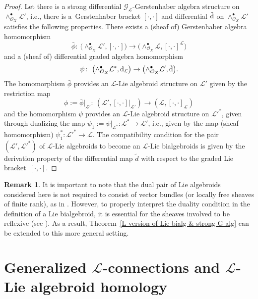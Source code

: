 \documentclass[pdftex]{sigma}
\numberwithin{equation}{section}
\theoremstyle{definition}
\newtheorem{Rem}[Thm]{Remark}
\begin{document}
\begin{proof}
	Let there is a strong differential $\mathcal{G}_{\mathcal{L}}$-Gerstenhaber algebra structure on
	$\wedge^\bullet_{\mathcal{O}_X} \mathcal{L}'$, i.e., there is a~Gerstenhaber bracket $[\cdot, \cdot]$ and differential $\tilde{{\rm d}}$ on $\wedge^\bullet_{\mathcal{O}_X} \mathcal{L}'$ satisfies the following properties. There exists a (sheaf of) Gerstenhaber algebra homomorphism
\[
\bar{\phi}\colon \ \bigl(\wedge^\bullet_{\mathcal{O}_X} \mathcal{L}', [\cdot, \cdot]\bigr) \rightarrow \bigl(\wedge_{\mathcal{O}_X}^\bullet \mathcal{L}, [\cdot,\cdot]^{\mathcal{L}}\bigr)
\]
	and a (sheaf of) differential graded algebra homomorphism
\[
\psi\colon \ \bigl(\wedge_{\mathcal{O}_X}^\bullet \mathcal{L}^*, {\rm d}_{\mathcal{L}}\bigr) \rightarrow \bigl(\wedge^\bullet_{\mathcal{O}_X} \mathcal{L}',\tilde{{\rm d}}\bigr).
\]
	The homomorphism $\bar{\phi}$ provides an $\mathcal{L}$-Lie algebroid structure on $\mathcal{L}'$ given by the restriction map
\[
\phi:=\bar{\phi}|_{\mathcal{L}'}\colon \ (\mathcal{L}', [\cdot, \cdot]|_{\mathcal{L}'}) \rightarrow (\mathcal{L}, [\cdot, \cdot]_{\mathcal{L}})
\]
	and the homomorphism $\psi$ provides an $\mathcal{L}$-Lie algebroid structure on $\mathcal{L}'^*$, given through dualizing the map
	$\psi_1:= \psi|_{\mathcal{L}^*}\colon \mathcal{L}^* \rightarrow \mathcal{L}'$, i.e., given by the map (sheaf homomorphism)
$\psi_1^*\colon \mathcal{L}'^* \rightarrow \mathcal{L}$.
The compatibility condition for the pair $(\mathcal{L}', \mathcal{L}'^*)$ of $\mathcal{L}$-Lie algebroids to become an $\mathcal{L}$-Lie bialgebroids is given by the derivation property of the differential map $\tilde{d}$ with respect to the graded Lie bracket~$[\cdot, \cdot]$.
\end{proof}
\begin{Rem} \label{BV-reflexive}
	It is important to note that the dual pair of Lie algebroids considered here is not required to consist of vector bundles (or locally free sheaves of finite rank), as in \cite{KM, KM-PX, PX}. However, to properly interpret the duality condition in the definition of a Lie bialgebroid, it is essential for the sheaves involved to be reflexive (see \cite{BP}). As a result, Theorem~\ref{L-version of Lie bialg & strong G alg} can be extended to this more general setting.
\end{Rem}

 \section[Generalized L-connections and L-Lie algebroid homology]{Generalized $\boldsymbol{\mathcal{L}}$-connections and $\boldsymbol{\mathcal{L}}$-Lie algebroid homology}
\label{Sec 6}
\end{document}
